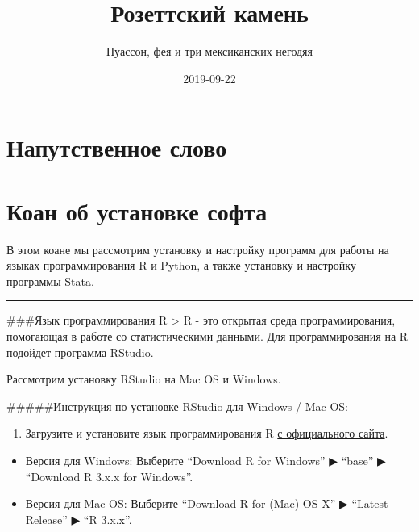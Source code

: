 \documentclass[]{book}
\title{Розеттский камень}
\author{Пуассон, фея и три мексиканских негодяя}
\date{2019-09-22}
\providecommand{\tightlist}{%
  \setlength{\itemsep}{0pt}\setlength{\parskip}{0pt}}
\begin{document}
\maketitle

{
\setcounter{tocdepth}{1}
\tableofcontents
}
\hypertarget{-}{%
\chapter{Напутственное слово}\label{-}}

\hypertarget{installsoft}{%
\chapter{Коан об установке софта}\label{installsoft}}

В этом коане мы рассмотрим установку и настройку программ для работы на языках программирования R и Python, а также установку и настройку программы Stata.

\begin{center}\rule{0.5\linewidth}{\linethickness}\end{center}

\#\#\#Язык программирования R
\textgreater{} R - это открытая среда программирования, помогающая в работе со статистическими данными. Для программирования на R подойдет программа RStudio.

Рассмотрим установку RStudio на Mac OS и Windows.

\#\#\#\#\#Инструкция по установке RStudio для Windows / Mac OS:

\begin{enumerate}
\def\labelenumi{\arabic{enumi}.}
\tightlist
\item
  Загрузите и установите язык программирования R \href{http://cran.cnr.berkeley.edu/}{с официального сайта}.
\end{enumerate}

\begin{itemize}
\item
  Версия для Windows: Выберите ``Download R for Windows'' ▶ ``base'' ▶ ``Download R 3.x.x for Windows''.
\item
  Версия для Mac OS: Выберите ``Download R for (Mac) OS X'' ▶ ``Latest Release'' ▶ ``R 3.x.x''.
\end{itemize}
\end{document}
